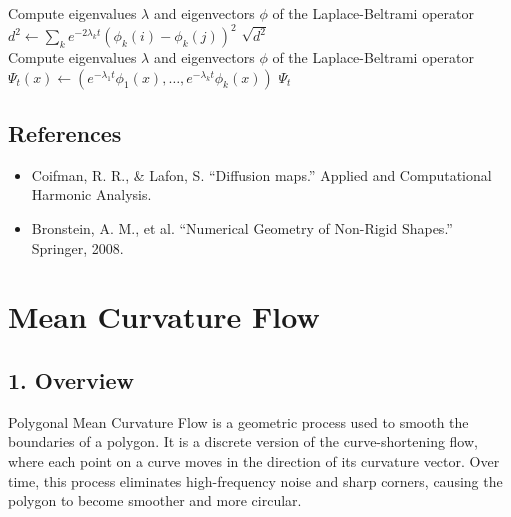 \begin{algorithm}
\caption{Compute Diffusion Distance}
\label{alg:compute_diffusion_distance}
\begin{algorithmic}[1]
    \State Compute eigenvalues $\lambda$ and eigenvectors $\phi$ of the Laplace-Beltrami operator
    \State $d^2 \gets \sum_{k} e^{-2\lambda_k t} (\phi_k(i) - \phi_k(j))^2$
    \State \Return $\sqrt{d^2}$
\EndFunction
\\
    \State Compute eigenvalues $\lambda$ and eigenvectors $\phi$ of the Laplace-Beltrami operator
        \State $\Psi_t(x) \gets \left(e^{-\lambda_1 t}\phi_1(x), \dots, e^{-\lambda_k t}\phi_k(x)\right)$
    \EndFor
    \State \Return $\Psi_t$
\EndFunction
\end{algorithmic}
\end{algorithm}

\subsection{References}

\begin{itemize}
    \item Coifman, R. R., \& Lafon, S. \cite{coifman2006} ``Diffusion maps.'' Applied and Computational Harmonic Analysis.
    \item Bronstein, A. M., et al. ``Numerical Geometry of Non-Rigid Shapes.'' Springer, 2008.
\end{itemize}

\section{Mean Curvature Flow}
\label{sec:mean_curvature_flow}

\subsection{1. Overview}

Polygonal Mean Curvature Flow is a geometric process used to smooth the boundaries of a polygon\cite{gage1986,grayson1987}. It is a discrete version of the curve-shortening flow, where each point on a curve moves in the direction of its curvature vector. Over time, this process eliminates high-frequency noise and sharp corners, causing the polygon to become smoother and more circular.

